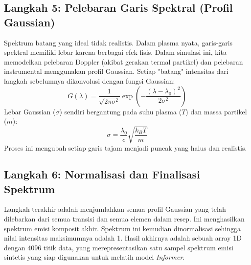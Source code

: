 \subsection{Langkah 5: Pelebaran Garis Spektral (Profil Gaussian)}
Spektrum batang yang ideal tidak realistis. Dalam plasma nyata, garis-garis spektral memiliki lebar karena berbagai efek fisis. Dalam simulasi ini, kita memodelkan pelebaran Doppler (akibat gerakan termal partikel) dan pelebaran instrumental menggunakan profil Gaussian. Setiap "batang" intensitas dari langkah sebelumnya dikonvolusi dengan fungsi Gaussian:
\begin{equation}
G(\lambda) = \frac{1}{\sqrt{2\pi \sigma^2}} \exp\left(-\frac{(\lambda - \lambda_0)^2}{2\sigma^2}\right)
\end{equation}
Lebar Gaussian ($\sigma$) sendiri bergantung pada suhu plasma ($T$) dan massa partikel ($m$):
\begin{equation}
\sigma = \frac{\lambda_0}{c} \sqrt{\frac{k_B T}{m}}
\end{equation}
Proses ini mengubah setiap garis tajam menjadi puncak yang halus dan realistis.

\subsection{Langkah 6: Normalisasi dan Finalisasi Spektrum}
Langkah terakhir adalah menjumlahkan semua profil Gaussian yang telah dilebarkan dari semua transisi dan semua elemen dalam resep. Ini menghasilkan spektrum emisi komposit akhir. Spektrum ini kemudian dinormalisasi sehingga nilai intensitas maksimumnya adalah 1.
Hasil akhirnya adalah sebuah array 1D dengan 4096 titik data, yang merepresentasikan satu sampel spektrum emisi sintetis yang siap digunakan untuk melatih model \textit{Informer}.